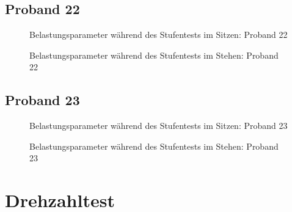 \documentclass[
  letterpaper,
  DIV=11]{scrartcl}
\begin{document}
\subsection{Proband 22}

\begin{figure}


\caption{\label{fig-ST1_22}Belastungsparameter während des Stufentests
im Sitzen: Proband 22}

\end{figure}%

\begin{figure}


\caption{\label{fig-ST2_22}Belastungsparameter während des Stufentests
im Stehen: Proband 22}

\end{figure}%

\subsection{Proband 23}

\begin{figure}


\caption{\label{fig-ST1_23}Belastungsparameter während des Stufentests
im Sitzen: Proband 23}

\end{figure}%

\begin{figure}


\caption{\label{fig-ST2_23}Belastungsparameter während des Stufentests
im Stehen: Proband 23}

\end{figure}%

\section{Drehzahltest}\label{drehzahltest}
\end{document}
